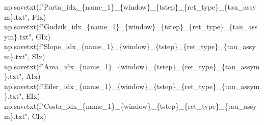 \documentclass[
  letterpaper,
]{report}
\newenvironment{Shaded}{\begin{snugshade}}{\end{snugshade}}
\newcommand{\NormalTok}[1]{\textcolor[rgb]{0.00,0.23,0.31}{#1}}
\newcommand{\SpecialCharTok}[1]{\textcolor[rgb]{0.37,0.37,0.37}{#1}}
\newcommand{\SpecialStringTok}[1]{\textcolor[rgb]{0.13,0.47,0.30}{#1}}
\begin{document}
\begin{Shaded}
\begin{Highlighting}[]
\NormalTok{np.savetxt(}\SpecialStringTok{f"Porta\_idx\_}\SpecialCharTok{\{}\NormalTok{name\_1}\SpecialCharTok{\}}\SpecialStringTok{\_}\SpecialCharTok{\{}\NormalTok{window}\SpecialCharTok{\}}\SpecialStringTok{\_}\SpecialCharTok{\{}\NormalTok{tstep}\SpecialCharTok{\}}\SpecialStringTok{\_}\SpecialCharTok{\{}\NormalTok{ret\_type}\SpecialCharTok{\}}\SpecialStringTok{\_}\SpecialCharTok{\{}\NormalTok{tau\_assym}\SpecialCharTok{\}}\SpecialStringTok{.txt"}\NormalTok{, PIx)}
\NormalTok{np.savetxt(}\SpecialStringTok{f"Gudzik\_idx\_}\SpecialCharTok{\{}\NormalTok{name\_1}\SpecialCharTok{\}}\SpecialStringTok{\_}\SpecialCharTok{\{}\NormalTok{window}\SpecialCharTok{\}}\SpecialStringTok{\_}\SpecialCharTok{\{}\NormalTok{tstep}\SpecialCharTok{\}}\SpecialStringTok{\_}\SpecialCharTok{\{}\NormalTok{ret\_type}\SpecialCharTok{\}}\SpecialStringTok{\_}\SpecialCharTok{\{}\NormalTok{tau\_assym}\SpecialCharTok{\}}\SpecialStringTok{.txt"}\NormalTok{, GIx)}
\NormalTok{np.savetxt(}\SpecialStringTok{f"Slope\_idx\_}\SpecialCharTok{\{}\NormalTok{name\_1}\SpecialCharTok{\}}\SpecialStringTok{\_}\SpecialCharTok{\{}\NormalTok{window}\SpecialCharTok{\}}\SpecialStringTok{\_}\SpecialCharTok{\{}\NormalTok{tstep}\SpecialCharTok{\}}\SpecialStringTok{\_}\SpecialCharTok{\{}\NormalTok{ret\_type}\SpecialCharTok{\}}\SpecialStringTok{\_}\SpecialCharTok{\{}\NormalTok{tau\_assym}\SpecialCharTok{\}}\SpecialStringTok{.txt"}\NormalTok{, SIx)}
\NormalTok{np.savetxt(}\SpecialStringTok{f"Area\_idx\_}\SpecialCharTok{\{}\NormalTok{name\_1}\SpecialCharTok{\}}\SpecialStringTok{\_}\SpecialCharTok{\{}\NormalTok{window}\SpecialCharTok{\}}\SpecialStringTok{\_}\SpecialCharTok{\{}\NormalTok{tstep}\SpecialCharTok{\}}\SpecialStringTok{\_}\SpecialCharTok{\{}\NormalTok{ret\_type}\SpecialCharTok{\}}\SpecialStringTok{\_}\SpecialCharTok{\{}\NormalTok{tau\_assym}\SpecialCharTok{\}}\SpecialStringTok{.txt"}\NormalTok{, AIx)}
\NormalTok{np.savetxt(}\SpecialStringTok{f"Eiler\_idx\_}\SpecialCharTok{\{}\NormalTok{name\_1}\SpecialCharTok{\}}\SpecialStringTok{\_}\SpecialCharTok{\{}\NormalTok{window}\SpecialCharTok{\}}\SpecialStringTok{\_}\SpecialCharTok{\{}\NormalTok{tstep}\SpecialCharTok{\}}\SpecialStringTok{\_}\SpecialCharTok{\{}\NormalTok{ret\_type}\SpecialCharTok{\}}\SpecialStringTok{\_}\SpecialCharTok{\{}\NormalTok{tau\_assym}\SpecialCharTok{\}}\SpecialStringTok{.txt"}\NormalTok{, EIx)}
\NormalTok{np.savetxt(}\SpecialStringTok{f"Costa\_idx\_}\SpecialCharTok{\{}\NormalTok{name\_1}\SpecialCharTok{\}}\SpecialStringTok{\_}\SpecialCharTok{\{}\NormalTok{window}\SpecialCharTok{\}}\SpecialStringTok{\_}\SpecialCharTok{\{}\NormalTok{tstep}\SpecialCharTok{\}}\SpecialStringTok{\_}\SpecialCharTok{\{}\NormalTok{ret\_type}\SpecialCharTok{\}}\SpecialStringTok{\_}\SpecialCharTok{\{}\NormalTok{tau\_assym}\SpecialCharTok{\}}\SpecialStringTok{.txt"}\NormalTok{, CIx)}
\end{Highlighting}
\end{Shaded}
\end{document}
